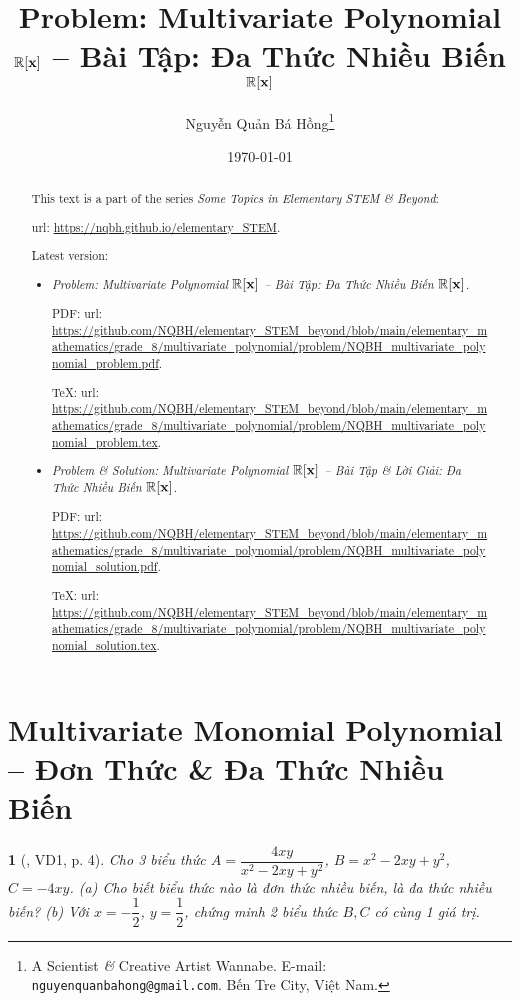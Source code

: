 \documentclass{article}
\title{Problem: Multivariate Polynomial $\mathbb{R}[{\bf x}]$ -- Bài Tập: Đa Thức Nhiều Biến $\mathbb{R}[{\bf x}]$}
\author{Nguyễn Quản Bá Hồng\footnote{A Scientist {\it\&} Creative Artist Wannabe. E-mail: {\tt nguyenquanbahong@gmail.com}. Bến Tre City, Việt Nam.}}
\date{\today}
\newtheorem{baitoan}{}
\begin{document}
\maketitle
\begin{abstract}
	This text is a part of the series {\it Some Topics in Elementary STEM \& Beyond}:
	
	{\sc url}: \url{https://nqbh.github.io/elementary_STEM}.
	
	Latest version:
	\begin{itemize}
		\item {\it Problem: Multivariate Polynomial $\mathbb{R}[{\bf x}]$ -- Bài Tập: Đa Thức Nhiều Biến $\mathbb{R}[{\bf x}]$}.
		
		PDF: {\sc url}: \url{https://github.com/NQBH/elementary_STEM_beyond/blob/main/elementary_mathematics/grade_8/multivariate_polynomial/problem/NQBH_multivariate_polynomial_problem.pdf}.
		
		\TeX: {\sc url}: \url{https://github.com/NQBH/elementary_STEM_beyond/blob/main/elementary_mathematics/grade_8/multivariate_polynomial/problem/NQBH_multivariate_polynomial_problem.tex}.
		\item {\it Problem \& Solution: Multivariate Polynomial $\mathbb{R}[{\bf x}]$ -- Bài Tập \& Lời Giải: Đa Thức Nhiều Biến $\mathbb{R}[{\bf x}]$}.
		
		PDF: {\sc url}: \url{https://github.com/NQBH/elementary_STEM_beyond/blob/main/elementary_mathematics/grade_8/multivariate_polynomial/problem/NQBH_multivariate_polynomial_solution.pdf}.
		
		\TeX: {\sc url}: \url{https://github.com/NQBH/elementary_STEM_beyond/blob/main/elementary_mathematics/grade_8/multivariate_polynomial/problem/NQBH_multivariate_polynomial_solution.tex}.
	\end{itemize}
\end{abstract}
\tableofcontents


\section{Multivariate Monomial Polynomial -- Đơn Thức \& Đa Thức Nhiều Biến}

\begin{baitoan}[\cite{Tuyen_Toan_8}, VD1, p. 4]
	Cho 3 biểu thức $A = \dfrac{4xy}{x^2 - 2xy + y^2}$, $B = x^2 - 2xy + y^2$, $C = -4xy$. (a) Cho biết biểu thức nào là đơn thức nhiều biến, là đa thức nhiều biến? (b) Với $x = -\dfrac{1}{2}$, $y = \dfrac{1}{2}$, chứng minh 2 biểu thức $B,C$ có cùng 1 giá trị.
\end{baitoan}
\end{document}
